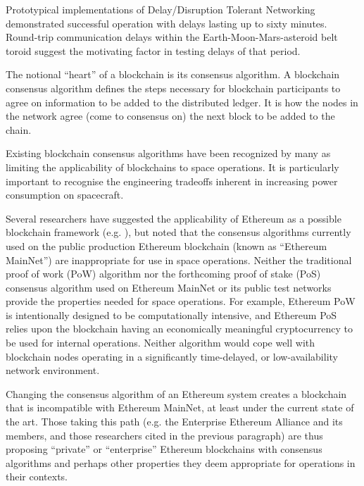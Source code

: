 \documentclass[]{aiaa-tc}%
\begin{document}
Prototypical implementations of Delay/Disruption Tolerant Networking demonstrated successful operation with delays lasting up to sixty minutes. Round-trip communication delays within the Earth-Moon-Mars-asteroid belt toroid suggest the motivating factor in testing delays of that period.

The notional ``heart'' of a blockchain is its consensus algorithm. A blockchain consensus algorithm defines the steps necessary for blockchain participants to agree on information to be added to the distributed ledger. It is how the nodes in the network agree (come to consensus on) the next block to be added to the chain\cite{hyland-wood_future_2018}.

Existing blockchain consensus algorithms have been recognized by many as limiting the applicability of blockchains to space operations\cite{yu_blockchain_2019,yu_situational_2019,mandl_bitcoin_2017,molesky_blockchain_2018,xu_exploration_2019}. It is particularly important to recognise the engineering tradeoffs inherent in increasing power consumption on spacecraft\cite{lyke_energy_2017}.

Several researchers have suggested the applicability of Ethereum as a possible blockchain framework (e.g. \cite{israel_space_2019}), but noted that the consensus algorithms currently used on the public production Ethereum blockchain (known as ``Ethereum MainNet'') are inappropriate for use in space operations\cite{molesky_blockchain_2018,xu_exploration_2019,mital_blockchain_2019}. Neither the traditional proof of work (PoW) algorithm nor the forthcoming proof of stake (PoS) consensus algorithm used on Ethereum MainNet or its public test networks provide the properties needed for space operations. For example, Ethereum PoW is intentionally designed to be computationally intensive, and Ethereum PoS relies upon the blockchain having an economically meaningful cryptocurrency to be used for internal operations. Neither algorithm would cope well with blockchain nodes operating in a significantly time-delayed, or low-availability network environment.

Changing the consensus algorithm of an Ethereum system creates a blockchain that is incompatible with Ethereum MainNet, at least under the current state of the art. Those taking this path (e.g. the Enterprise Ethereum Alliance and its members, and those researchers cited in the previous paragraph) are thus proposing ``private'' or ``enterprise'' Ethereum blockchains with consensus algorithms and perhaps other properties they deem appropriate for operations in their contexts.
\end{document}
